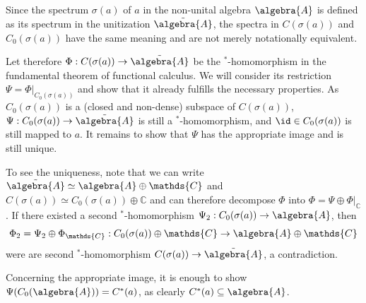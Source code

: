 \documentclass[a4paper]{article}
\begin{document}
\subsection{}

Since the spectrum $\sigma(a)$ of $a$ in the non-unital algebra $\algebra{A}$ is defined as its spectrum in the unitization $\tilde{\algebra{A}}$, the spectra in $C(\sigma(a))$ and $C_0(\sigma(a))$ have the same meaning and are not merely notationally equivalent.

Let therefore $\Phi: C(\sigma(a)) \to \tilde{\algebra{A}}$ be the $^*$-homomorphism in the fundamental theorem of functional calculus.
We will consider its restriction $\Psi = \Phi|_{C_0(\sigma(a))}$ and show that it already fulfills the necessary properties.
As $C_0(\sigma(a))$ is a (closed and non-dense) subspace of $C(\sigma(a))$, $\Psi: C_0(\sigma(a)) \to \tilde{\algebra{A}}$ is still a $^*$-homomorphism, and $\id \in C_0(\sigma(a))$ is still mapped to $a$.
It remains to show that $\Psi$ has the appropriate image and is still unique.

To see the uniqueness, note that we can write $\tilde{\algebra{A}} \simeq \algebra{A} \oplus \mathds{C}$ and $C(\sigma(a)) \simeq C_0(\sigma(a)) \oplus \mathds{C}$ and can therefore decompose $\Phi$ into $\Phi = \Psi \oplus \Phi|_\mathds{C}$.
If there existed a second $^*$-homomorphism $\Psi_2: C_0(\sigma(a)) \to \algebra{A}$, then
\begin{equation*}
    \Phi_2 = \Psi_2 \oplus \Phi_\mathds{C}: C_0(\sigma(a)) \oplus \mathds{C} \to \algebra{A} \oplus \mathds{C}
\end{equation*}
were are second $^*$-homomorphism $C(\sigma(a)) \to \tilde{\algebra{A}}$, a contradiction.

Concerning the appropriate image, it is enough to show $\Psi(C_0(\algebra{A})) = C^*(a)$, as clearly $C^*(a) \subseteq \algebra{A}$.
\end{document}
